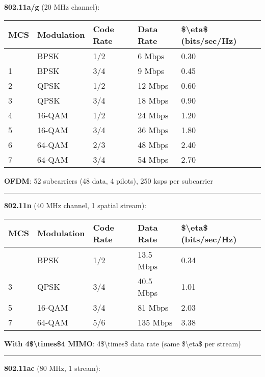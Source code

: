\textbf{802.11a/g} (20 MHz channel):

{\def\LTcaptype{} %
\begin{longtable}[]{@{}lllll@{}}
\toprule\noalign{}
MCS & Modulation & Code Rate & Data Rate & \$\textbackslash eta\$
(bits/sec/Hz) \\
\midrule\noalign{}
\endhead
\bottomrule\noalign{}
\endlastfoot
0 & BPSK & 1/2 & 6 Mbps & 0.30 \\
1 & BPSK & 3/4 & 9 Mbps & 0.45 \\
2 & QPSK & 1/2 & 12 Mbps & 0.60 \\
3 & QPSK & 3/4 & 18 Mbps & 0.90 \\
4 & 16-QAM & 1/2 & 24 Mbps & 1.20 \\
5 & 16-QAM & 3/4 & 36 Mbps & 1.80 \\
6 & 64-QAM & 2/3 & 48 Mbps & 2.40 \\
7 & 64-QAM & 3/4 & 54 Mbps & 2.70 \\
\end{longtable}
}

\textbf{OFDM}: 52 subcarriers (48 data, 4 pilots), 250 ksps per
subcarrier

\begin{center}\rule{0.5\linewidth}{0.5pt}\end{center}

\textbf{802.11n} (40 MHz channel, 1 spatial stream):

{\def\LTcaptype{} %
\begin{longtable}[]{@{}lllll@{}}
\toprule\noalign{}
MCS & Modulation & Code Rate & Data Rate & \$\textbackslash eta\$
(bits/sec/Hz) \\
\midrule\noalign{}
\endhead
\bottomrule\noalign{}
\endlastfoot
0 & BPSK & 1/2 & 13.5 Mbps & 0.34 \\
3 & QPSK & 3/4 & 40.5 Mbps & 1.01 \\
5 & 16-QAM & 3/4 & 81 Mbps & 2.03 \\
7 & 64-QAM & 5/6 & 135 Mbps & 3.38 \\
\end{longtable}
}

\textbf{With 4\$\textbackslash times\$4 MIMO}: 4\$\textbackslash times\$
data rate (same \$\textbackslash eta\$ per stream)

\begin{center}\rule{0.5\linewidth}{0.5pt}\end{center}

\textbf{802.11ac} (80 MHz, 1 stream):

